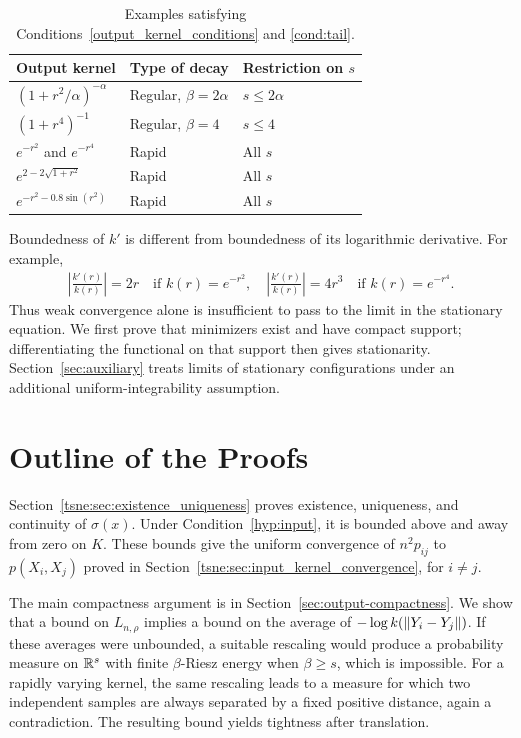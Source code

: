 \begin{table}[htbp]
\centering\small
\begin{tabular}{@{}p{.39\linewidth}p{.22\linewidth}p{.31\linewidth}@{}}
\toprule
Output kernel & Type of decay & Restriction on $s$ \\
\midrule
$(1+r^2/\alpha)^{-\alpha}$ & Regular, $\beta=2\alpha$ & $s\leq2\alpha$ \\
$(1+r^4)^{-1}$ & Regular, $\beta=4$ & $s\leq4$ \\
$e^{-r^2}$ and $e^{-r^4}$ & Rapid & All $s$ \\
$e^{2-2\sqrt{1+r^2}}$ & Rapid & All $s$ \\
$e^{-r^2-0.8\sin(r^2)}$ & Rapid & All $s$ \\
\bottomrule
\end{tabular}
\caption{Examples satisfying Conditions~\ref{output_kernel_conditions} and \ref{cond:tail}.}\label{tab:theory-coverage}
\end{table}

Boundedness of $k'$ is different from boundedness of its logarithmic derivative. For example,
\begin{align}\label{eq:unbounded-log-slopes}
\left|\frac{k'(r)}{k(r)}\right|=2r
\quad\text{if }k(r)=e^{-r^2},\quad
\left|\frac{k'(r)}{k(r)}\right|=4r^3
\quad\text{if }k(r)=e^{-r^4}.
\end{align}
Thus weak convergence alone is insufficient to pass to the limit in the stationary equation. We first prove that minimizers exist and have compact support; differentiating the functional on that support then gives stationarity. Section~\ref{sec:auxiliary} treats limits of stationary configurations under an additional uniform-integrability assumption.

\section{Outline of the Proofs}\label{tsne:sec:summary_structure}
Section~\ref{tsne:sec:existence_uniqueness} proves existence, uniqueness, and continuity of $\sigma(x)$. Under Condition~\ref{hyp:input}, it is bounded above and away from zero on $K$. These bounds give the uniform convergence of $n^2p_{ij}$ to $p(X_i,X_j)$ proved in Section~\ref{tsne:sec:input_kernel_convergence}, for $i\ne j$.

The main compactness argument is in Section~\ref{sec:output-compactness}. We show that a bound on $L_{n,\rho}$ implies a bound on the average of $-\log k(\left\lVert Y_i-Y_j\right\rVert)$. If these averages were unbounded, a suitable rescaling would produce a probability measure on $\mathbb{R}^s$ with finite $\beta$-Riesz energy when $\beta\geq s$, which is impossible. For a rapidly varying kernel, the same rescaling leads to a measure for which two independent samples are always separated by a fixed positive distance, again a contradiction. The resulting bound yields tightness after translation.

